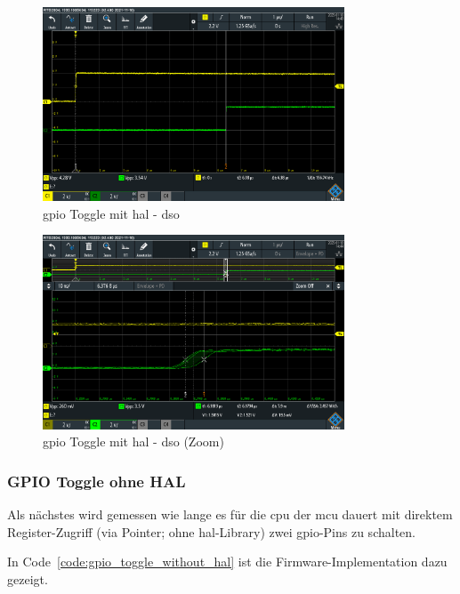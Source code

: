 \documentclass[11pt,a4paper,hidelinks]{article}
\begin{document}
\begin{figure}[H]
    \centering
    \includegraphics[width=0.8\textwidth]{graphics/gpio_toggle_with_hal_dso.png}
    \caption{\acrshort{gpio} Toggle mit \acrshort{hal} - \acrshort{dso}}\label{fig:gpio_toggle_with_hal_dso}
\end{figure}

\begin{figure}[H]
    \centering
    \includegraphics[width=0.8\textwidth]{graphics/gpio_toggle_with_hal_dso_zoom.png}
    \caption{\acrshort{gpio} Toggle mit \acrshort{hal} - \acrshort{dso} (Zoom)}\label{fig:gpio_toggle_with_hal_dso_zoom}
\end{figure}

\subsubsection{GPIO Toggle ohne HAL}\label{sec:gpio_toggle_without_hal}

Als nächstes wird gemessen wie lange es für die \acrshort{cpu} der \acrshort{mcu} dauert mit direktem Register-Zugriff
(via Pointer; ohne \acrshort{hal}-Library) zwei \acrshort{gpio}-Pins zu schalten.

In Code~\ref{code:gpio_toggle_without_hal} ist die Firmware-Implementation dazu gezeigt.
\end{document}
